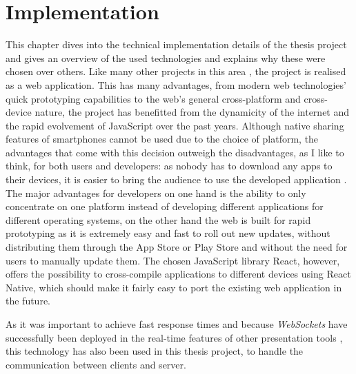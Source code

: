 \chapter{Implementation}
\label{cha:implementation}

This chapter dives into the technical implementation details of the thesis project and gives an overview of the used technologies and explains why these were chosen over others. Like many other projects in this area \cite{Bry:Backstage, Cheng:TreebasedOnlinePresentations, Esponda:ElectronicVotingOnTheFly, Inoue:RealTimeQuestionnaire, Teevan:MobileFeedbackDuringPresentation, Triglianos:InteractiveWebPresentationsImpress}, the project is realised as a web application. This has many advantages, from modern web technologies' quick prototyping capabilities to the web's general cross-platform and cross-device nature, the project has benefitted from the dynamicity of the internet and the rapid evolvement of JavaScript over the past years.
Although native sharing features of smartphones cannot be used due to the choice of platform, the advantages that come with this decision outweigh the disadvantages, as I like to think, for both users and developers: as nobody has to download any apps to their devices, it is easier to bring the audience to use the developed application \cite{Triglianos:InteractiveWebPresentationsImpress}. The major advantages for developers on one hand is the ability to only concentrate on one platform instead of developing different applications for different operating systems, on the other hand the web is built for rapid prototyping as it is extremely easy and fast to roll out new updates, without distributing them through the App Store or Play Store and without the need for users to manually update them. The chosen JavaScript library React, however, offers the possibility to cross-compile applications to different devices using React Native, which should make it fairly easy to port the existing web application in the future.

As it was important to achieve fast response times and because \emph{WebSockets} have successfully been deployed in the real-time features of other presentation tools \cite{Inoue:RealTimeQuestionnaire, Triglianos:InteractiveWebPresentationsImpress}, this technology has also been used in this thesis project, to handle the communication between clients and server.

